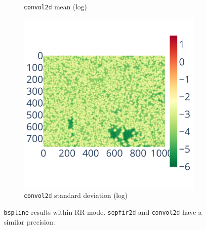 \documentclass[10pt,journal,compsoc]{IEEEtran}
\begin{document}
\begin{figure}
\begin{subfigure}{0.3\linewidth}
        \caption{\centering\texttt{convol2d} mean (log)}
        \label{fig:bspline_convol2d_mean}
    \end{subfigure}
    \begin{subfigure}{0.3\linewidth}
        \includegraphics[width=\linewidth]{figure/bspline/convol2d_std_log.pdf}
        \caption{\centering\texttt{convol2d} standard deviation (log)}
        \label{fig:bspline_convol2d_std}
    \end{subfigure}
    \caption{\texttt{bspline} results within RR mode. \texttt{sepfir2d} and
        \texttt{convol2d} have a similar precision.
    }
    \label{fig:bspline_rr}
\end{figure}
\end{document}
